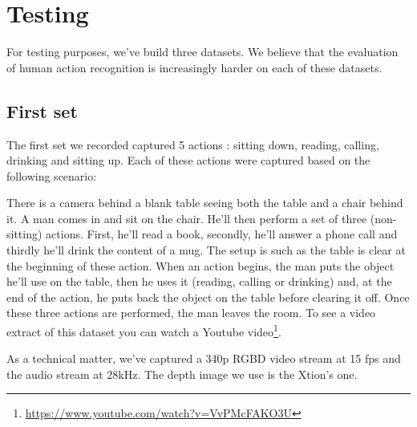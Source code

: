 \documentclass[a4paper]{article}
\begin{document}
	\section{Testing}
	\label{sec:testing}
	
		For testing purposes, we've build three datasets. We believe that the evaluation of human action recognition is increasingly harder on each of these datasets. 


		\subsection{First set}
		\label{sub:first_set}
		
			The first set we recorded captured 5 actions : sitting down, reading, calling, drinking and sitting up. Each of these actions were captured based on the following scenario:

			There is a camera behind a blank table seeing both the table and a chair behind it. A man comes in and sit on the chair. He'll then perform a set of three (non-sitting) actions. First, he'll read a book, secondly, he'll answer a phone call and thirdly he'll drink the content of a mug. The setup is such as the table is clear at the beginning of these action. When an action begins, the man puts the object he'll use on the table, then he uses it (reading, calling or drinking) and, at the end of the action, he puts back the object on the table before clearing it off. Once these three actions are performed, the man leaves the room. To see a video extract of this dataset you can watch a Youtube video\footnote{\url{https://www.youtube.com/watch?v=VvPMcFAKO3U}}.
			
			As a technical matter, we've captured a 340p RGBD video stream at 15 fps and the audio stream at 28kHz. The depth image we use is the Xtion's one.






	


	
	
\end{document}
